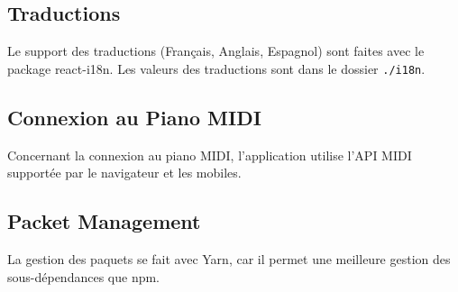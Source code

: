 \subsection*{Traductions}
Le support des traductions (Français, Anglais, Espagnol) sont faites avec le package react-i18n. Les valeurs des traductions sont dans le dossier \verb|./i18n|.

\subsection*{Connexion au Piano MIDI}
Concernant la connexion au piano MIDI, l’application utilise l’API MIDI supportée par le navigateur et les mobiles.

\subsection*{Packet Management}
La gestion des paquets se fait avec Yarn, car il permet une meilleure gestion des sous-dépendances que npm.
